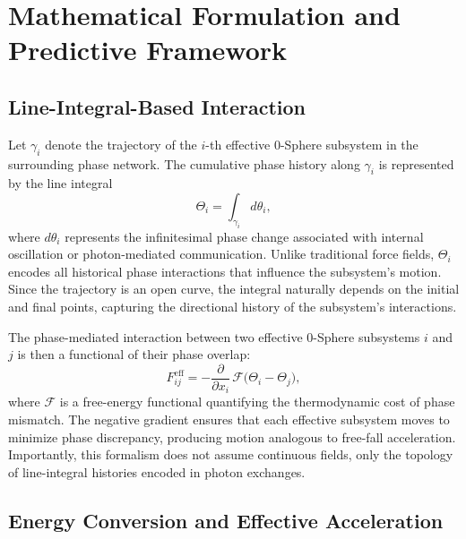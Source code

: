 \documentclass[
 reprint,
 amsmath,amssymb,
 aps,
 prb,
]{revtex4-2}
\numberwithin{equation}{section}
\begin{document}
\section{Mathematical Formulation and Predictive Framework}
\label{sec:math}

\subsection{Line-Integral-Based Interaction}

Let $\gamma_i$ denote the trajectory of the $i$-th effective 0-Sphere subsystem in the surrounding phase network. The cumulative phase history along $\gamma_i$ is represented by the line integral \cite{Hanamura2026Trilogy3,AharonovBohm1959,Berry1984}
\begin{equation}
\Theta_i = \int_{\gamma_i} d\theta_i,
\label{eq:phase_history}
\end{equation}
where $d\theta_i$ represents the infinitesimal phase change associated with internal oscillation or photon-mediated communication. Unlike traditional force fields, $\Theta_i$ encodes all historical phase interactions that influence the subsystem's motion. Since the trajectory is an open curve, the integral naturally depends on the initial and final points, capturing the directional history of the subsystem's interactions.

The phase-mediated interaction between two effective 0-Sphere subsystems $i$ and $j$ is then a functional of their phase overlap:
\begin{equation}
F_{ij}^\text{eff} = - \frac{\partial}{\partial x_i} \, \mathcal{F}\Big( \Theta_i - \Theta_j \Big),
\label{eq:effective_force}
\end{equation}
where $\mathcal{F}$ is a free-energy functional \cite{Jaynes2003,Verlinde2011} quantifying the thermodynamic cost of phase mismatch. The negative gradient ensures that each effective subsystem moves to minimize phase discrepancy, producing motion analogous to free-fall acceleration. Importantly, this formalism does not assume continuous fields, only the topology of line-integral histories encoded in photon exchanges.

\subsection{Energy Conversion and Effective Acceleration}
\end{document}
